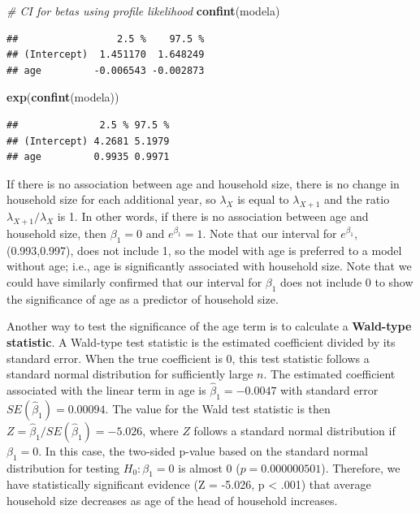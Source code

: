 \documentclass[
]{krantz}
\newenvironment{Shaded}{\begin{snugshade}}{\end{snugshade}}
\newcommand{\CommentTok}[1]{\textcolor[rgb]{0.37,0.37,0.37}{\textit{#1}}}
\newcommand{\KeywordTok}[1]{\textcolor[rgb]{0.27,0.27,0.27}{\textbf{#1}}}
\newcommand{\NormalTok}[1]{#1}
\begin{document}
\begin{Shaded}
\begin{Highlighting}[]
\CommentTok{# CI for betas using profile likelihood}
\KeywordTok{confint}\NormalTok{(modela)}
\end{Highlighting}
\end{Shaded}

\begin{verbatim}
##                 2.5 %    97.5 %
## (Intercept)  1.451170  1.648249
## age         -0.006543 -0.002873
\end{verbatim}

\begin{Shaded}
\begin{Highlighting}[]
\KeywordTok{exp}\NormalTok{(}\KeywordTok{confint}\NormalTok{(modela))}
\end{Highlighting}
\end{Shaded}

\begin{verbatim}
##              2.5 % 97.5 %
## (Intercept) 4.2681 5.1979
## age         0.9935 0.9971
\end{verbatim}

If there is no association between age and household size, there is no change in household size for each additional year, so \(\lambda_X\) is equal to \(\lambda_{X+1}\) and the ratio \(\lambda_{X+1}/\lambda_X\) is 1. In other words, if there is no association between age and household size, then \(\beta_1=0\) and \(e^{\beta_1}=1\). Note that our interval for \(e^{\beta_1}\), (0.993,0.997), does not include 1, so the model with age is preferred to a model without age; i.e., age is significantly associated with household size. Note that we could have similarly confirmed that our interval for \(\beta_1\) does not include 0 to show the significance of age as a predictor of household size.

Another way to test the significance of the age term is to calculate a \textbf{Wald-type statistic}.  A Wald-type test statistic is the estimated coefficient divided by its standard error. When the true coefficient is 0, this test statistic follows a standard normal distribution for sufficiently large \(n\). The estimated coefficient associated with the linear term in age is \({\hat{\beta}_1}=-0.0047\) with standard error \(SE(\hat{\beta}_1)=0.00094\). The value for the Wald test statistic is then \(Z=\hat{\beta}_1/SE(\hat{\beta}_1)=-5.026\), where \(Z\) follows a standard normal distribution if \(\beta_1=0\). In this case, the two-sided p-value based on the standard normal distribution for testing \(H_0:\beta_1=0\) is almost 0 (\(p=0.000000501\)). Therefore, we have statistically significant evidence (Z = -5.026, p \textless{} .001) that average household size decreases as age of the head of household increases.
\end{document}
